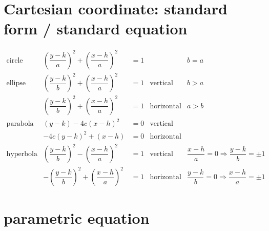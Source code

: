 \documentclass[
]{book}
\theoremstyle{definition}
\theoremstyle{definition}
\theoremstyle{definition}
\theoremstyle{definition}
\theoremstyle{remark}
\begin{document}
\hypertarget{cartesian-coordinate-standard-form-standard-equation}{%
\section{Cartesian coordinate: standard form / standard equation}\label{cartesian-coordinate-standard-form-standard-equation}}

\[
\begin{array}{ccccc}
\text{circle} & \left(\dfrac{y-k}{a}\right)^{2}+\left(\dfrac{x-h}{a}\right)^{2} & =1 &  & b=a\\
\text{ellipse} & \left(\dfrac{y-k}{b}\right)^{2}+\left(\dfrac{x-h}{a}\right)^{2} & =1 & \text{vertical} & b>a\\
 & \left(\dfrac{y-k}{b}\right)^{2}+\left(\dfrac{x-h}{a}\right)^{2} & =1 & \text{horizontal} & a>b\\
\text{parabola} & \left(y-k\right)-4c\left(x-h\right)^{2} & =0 & \text{vertical}\\
 & -4c\left(y-k\right)^{2}+\left(x-h\right) & =0 & \text{horizontal}\\
\text{hyperbola} & \left(\dfrac{y-k}{b}\right)^{2}-\left(\dfrac{x-h}{a}\right)^{2} & =1 & \text{vertical} & \dfrac{x-h}{a}=0\Rightarrow\dfrac{y-k}{b}=\pm1\\
 & -\left(\dfrac{y-k}{b}\right)^{2}+\left(\dfrac{x-h}{a}\right)^{2} & =1 & \text{horizontal} & \dfrac{y-k}{b}=0\Rightarrow\dfrac{x-h}{a}=\pm1
\end{array}
\]

\hypertarget{parametric-equation}{%
\section{parametric equation}\label{parametric-equation}}
\end{document}
